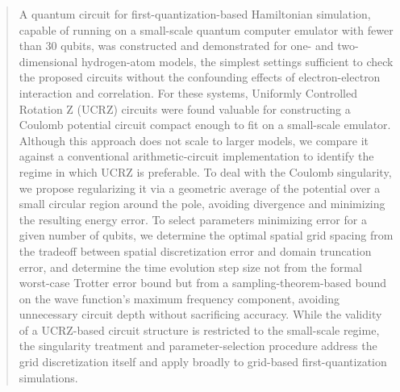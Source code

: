 \documentclass[aip, adv, amsmath, amssymb, reprint]{revtex4-1}
\begin{document}
\begin{abstract}

A quantum circuit for first-quantization-based Hamiltonian simulation, capable
of running on a small-scale quantum computer emulator with fewer than 30 qubits,
was constructed and demonstrated for one- and two-dimensional hydrogen-atom
models, the simplest settings sufficient to check the proposed circuits without
the confounding effects of electron-electron interaction and correlation. For
these systems, Uniformly Controlled Rotation Z (UCRZ) circuits were found
valuable for constructing a Coulomb potential circuit compact enough to fit on a
small-scale emulator. Although this approach does not scale to larger models, we
compare it against a conventional arithmetic-circuit implementation to identify
the regime in which UCRZ is preferable. To deal with the Coulomb singularity, we
propose regularizing it via a geometric average of the potential over a small
circular region around the pole, avoiding divergence and minimizing the
resulting energy error. To select parameters minimizing error for a given number
of qubits, we determine the optimal spatial grid spacing from the tradeoff
between spatial discretization error and domain truncation error, and determine
the time evolution step size not from the formal worst-case Trotter error bound
but from a sampling-theorem-based bound on the wave function's maximum frequency
component, avoiding unnecessary circuit depth without sacrificing accuracy.
While the validity of a UCRZ-based circuit structure is restricted to the
small-scale regime, the singularity treatment and parameter-selection procedure
address the grid discretization itself and apply broadly to grid-based
first-quantization simulations.

\end{abstract}

\maketitle %




\end{document}
